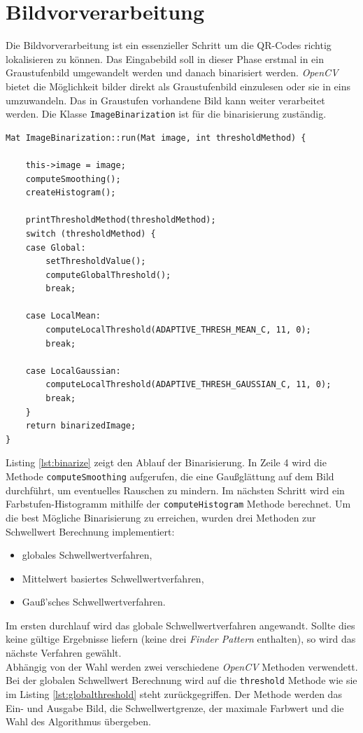 \section{Bildvorverarbeitung}
Die Bildvorverarbeitung ist ein essenzieller Schritt um die QR-Codes richtig lokalisieren zu können. Das Eingabebild soll in dieser Phase erstmal in ein Graustufenbild umgewandelt werden und danach binarisiert werden. \emph{OpenCV} bietet die Möglichkeit bilder direkt als Graustufenbild einzulesen oder sie in eins umzuwandeln. Das in Graustufen vorhandene Bild kann weiter verarbeitet werden.
Die Klasse \texttt{ImageBinarization} ist für die binarisierung zuständig. 
\begin{lstlisting}[label=lst:binarize, caption=Ablauf der Binarisation.]
Mat ImageBinarization::run(Mat image, int thresholdMethod) {

	this->image = image;
	computeSmoothing();
	createHistogram();

	printThresholdMethod(thresholdMethod);
	switch (thresholdMethod) {
	case Global:
		setThresholdValue();
		computeGlobalThreshold();
		break;

	case LocalMean:
		computeLocalThreshold(ADAPTIVE_THRESH_MEAN_C, 11, 0);
		break;

	case LocalGaussian:
		computeLocalThreshold(ADAPTIVE_THRESH_GAUSSIAN_C, 11, 0);
		break;
	}
	return binarizedImage;
}
\end{lstlisting}
Listing \ref{lst:binarize} zeigt den Ablauf der Binarisierung. In Zeile 4 wird die Methode \texttt{computeSmoothing} aufgerufen, die eine Gaußglättung auf dem Bild durchführt, um eventuelles Rauschen zu mindern. Im nächsten Schritt wird ein Farbstufen-Histogramm mithilfe der \texttt{computeHistogram} Methode berechnet. Um die best Mögliche Binarisierung zu erreichen, wurden drei Methoden zur Schwellwert Berechnung implementiert:
\begin{itemize}
	\item globales Schwellwertverfahren,
	\item Mittelwert basiertes Schwellwertverfahren,
	\item Gauß'sches Schwellwertverfahren.
\end{itemize} 
Im ersten durchlauf wird das globale Schwellwertverfahren angewandt. Sollte dies keine gültige Ergebnisse liefern (keine drei \emph{Finder Pattern} enthalten), so wird das nächste Verfahren gewählt. \\

Abhängig von der Wahl werden zwei verschiedene \emph{OpenCV} Methoden verwendett. Bei der globalen Schwellwert Berechnung wird auf die \texttt{threshold} Methode wie sie im Listing \ref{lst:globalthreshold} steht zurückgegriffen. Der Methode werden das Ein- und Ausgabe Bild, die Schwellwertgrenze, der maximale Farbwert und die Wahl des Algorithmus übergeben. 

